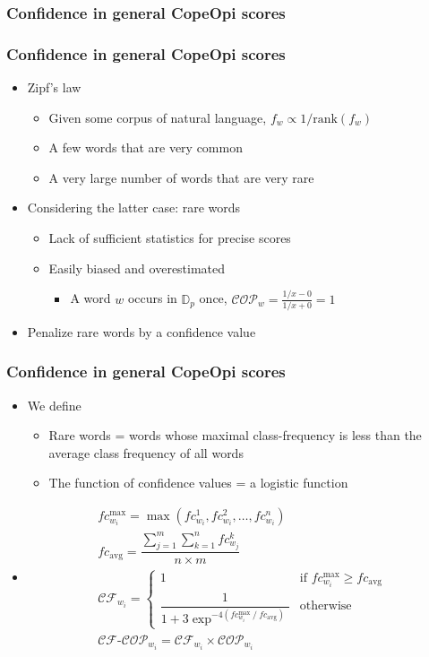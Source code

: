 \documentclass[mathserif]{beamer}
\DeclareMathOperator*{\divby}{/}
\DeclareMathOperator*{\maxi}{max}
\DeclareMathOperator*{\avg}{avg}
\begin{document}
\subsubsection{Confidence in general CopeOpi scores}
\begin{frame}
\frametitle{Confidence in general CopeOpi scores}
\begin{itemize}
\item Zipf's law
	\begin{itemize}
	\item Given some corpus of natural language, $f_w \propto 1 /\mathrm{rank}(f_w)$
	\item A few words that are very common
	\item A very large number of words that are very rare
	\end{itemize}
\item Considering the latter case: rare words
	\begin{itemize}
	\item Lack of sufficient statistics for precise scores
	\item Easily biased and overestimated
		\begin{itemize}
		\item A word $w$ occurs in $\mathbb{D}_p$ once, $\mathcal{COP}_{w}=\frac{1/x-0}{1/x+0}=1$
		\end{itemize}
	\end{itemize}
\item Penalize rare words by a confidence value
\end{itemize}
\end{frame}
\begin{frame}
\frametitle{Confidence in general CopeOpi scores}
\begin{itemize}
\item We define
\begin{itemize}
\item Rare words = words whose maximal class-frequency is less than the average class frequency of all words
\item The function of confidence values = a logistic function 
\end{itemize}
\item[] \vspace{-5ex}\begin{equation*}
\begin{gathered}
fc^{\maxi}_{w_i} = \maxi(fc^1_{w_i},fc^2_{w_i},\dots,fc^n_{w_i})
\\
fc_{\avg} = \dfrac {
	\sum_{j=1}^m \sum_{k=1}^n fc^k_{w_j}
}{
	n \times m
}
\\
\mathcal{CF}_{w_i} =
\begin{cases}
	1
	&\text{if $fc^{\maxi}_{w_i} \geq fc_{\avg}$}
\\
	\dfrac{1}{1 + 3 \exp^{-4(fc^{\maxi}_{w_i} \divby fc_{\avg})}}
	&\text{otherwise}
\end{cases}
\\
\mathcal{CF}\text{-}\mathcal{COP}_{w_i} = \mathcal{CF}_{w_i} \times \mathcal{COP}_{w_i}
\end{gathered}
\end{equation*}
\end{itemize}
\end{frame}
\end{document}
